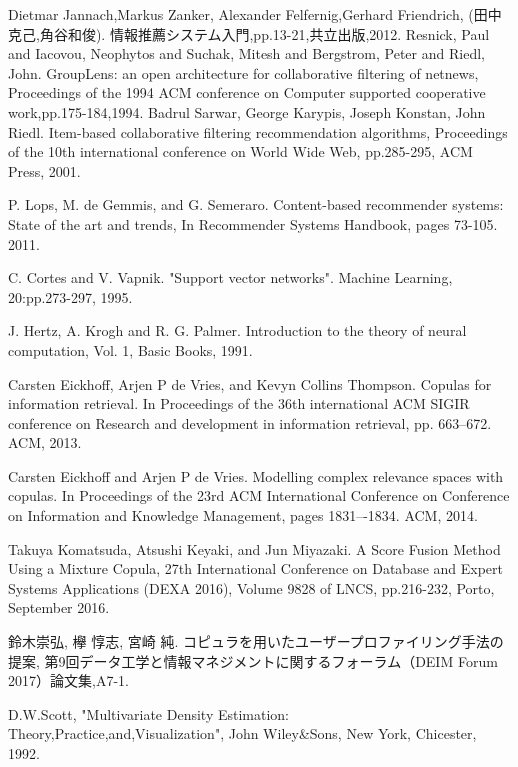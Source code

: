 \begin{thebibliography}{99}%
Dietmar Jannach,Markus Zanker, Alexander Felfernig,Gerhard Friendrich,
(田中克己,角谷和俊).
情報推薦システム入門,pp.13-21,共立出版,2012.
Resnick, Paul and Iacovou, Neophytos and Suchak, Mitesh and Bergstrom, Peter and Riedl, John.
GroupLens: an open architecture for collaborative filtering of netnews,
Proceedings of the 1994 ACM conference on Computer supported cooperative work,pp.175-184,1994.
Badrul Sarwar, George Karypis, Joseph Konstan, John Riedl.
Item-based collaborative filtering recommendation algorithms,
Proceedings of the 10th international conference on World Wide Web, pp.285-295, ACM Press, 2001.

P. Lops, M. de Gemmis, and G. Semeraro.
Content-based recommender systems: State of the art and trends,
In Recommender Systems Handbook, pages 73-105. 2011.


C. Cortes and V. Vapnik. "Support vector networks". Machine Learning, 20:pp.273-297, 1995.

J. Hertz, A. Krogh and R. G. Palmer. Introduction to the theory of neural computation, Vol. 1, Basic Books, 1991.

Carsten Eickhoff, Arjen P de Vries, and Kevyn Collins Thompson.
Copulas for information retrieval.
In Proceedings of the 36th international ACM SIGIR conference
on Research and development in information retrieval, pp. 663--672. ACM, 2013.

Carsten Eickhoff and Arjen P de Vries.
Modelling complex relevance spaces with copulas.
In Proceedings of the 23rd ACM International Conference on Conference on Information and Knowledge Management,
pages 1831–-1834. ACM, 2014.

Takuya Komatsuda, Atsushi Keyaki, and Jun Miyazaki.
A Score Fusion Method Using a Mixture Copula,
27th International Conference on Database and Expert Systems Applications (DEXA 2016),
Volume 9828 of LNCS, pp.216-232, Porto,
September 2016.

鈴木崇弘, 欅 惇志, 宮崎 純.
コピュラを用いたユーザープロファイリング手法の提案,
第9回データ工学と情報マネジメントに関するフォーラム（DEIM Forum 2017）論文集,A7-1.

D.W.Scott,
"Multivariate Density Estimation:\\
Theory,Practice,and,Visualization",
John Wiley\&Sons,
New York,
Chicester,
1992.


\end{thebibliography}
